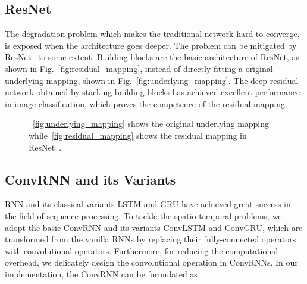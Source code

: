 \documentclass[journal,comsoc]{IEEEtran}
\begin{document}
\subsection{ResNet}
The degradation problem which makes the traditional network hard to converge, is exposed when the architecture goes deeper. The problem can be mitigated by ResNet~\cite{DBLP:journals/corr/HeZRS15} to some extent. Building blocks are the basic architecture of ResNet, as shown in Fig.~\ref{fig:residual_mapping}, instead of directly fitting a original underlying mapping, shown in Fig.~\ref{fig:underlying_mapping}. The deep residual network obtained by stacking building blocks has achieved excellent performance in image classification, which proves the competence of the residual mapping.

\begin{figure}[h] 
  \centering 
    \quad \quad




  \caption{~\ref{fig:underlying_mapping} shows the original underlying mapping while~\ref{fig:residual_mapping} shows the residual mapping in ResNet~\cite{DBLP:journals/corr/HeZRS15}.
} 
\label{fig:ResNet}
\end{figure}












\subsection{ConvRNN and its Variants}

RNN and its classical variants LSTM and GRU have achieved great success in the field of sequence processing. To tackle the spatio-temporal problems, we adopt the basic ConvRNN and its variants ConvLSTM and ConvGRU, which are transformed from the vanilla RNNs by replacing their fully-connected operators with convolutional operators. Furthermore, for reducing the computational overhead, we delicately design the convolutional operation in ConvRNNs. In our implementation, the ConvRNN can be formulated as
\end{document}
